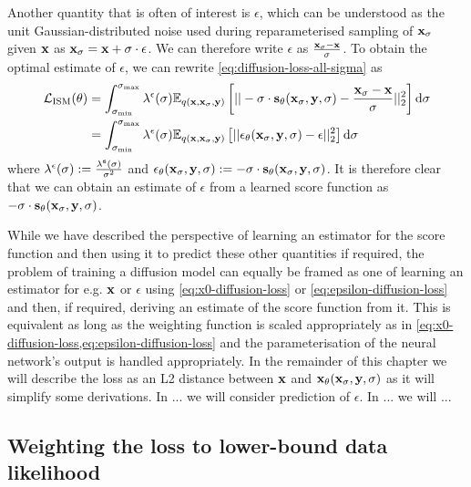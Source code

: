 Another quantity that is often of interest is $\epsilon$, which can be understood as the unit Gaussian-distributed noise used during reparameterised sampling of ${\mathbf{x}}_\sigma$ given ${\mathbf{x}}$ as ${\mathbf{x}}_\sigma = {\mathbf{x}} + \sigma \cdot \epsilon$. We can therefore write $\epsilon$ as $\frac{{\mathbf{x}}_\sigma-{\mathbf{x}}}{\sigma}$. To obtain the optimal estimate of $\epsilon$, we can rewrite \cref{eq:diffusion-loss-all-sigma} as
\begin{align} \label{eq:epsilon-diffusion-loss}
    \mathcal{L}_\text{ISM}(\theta) &= \int_{\sigma_\text{min}}^{\sigma_\text{max}} \lambda^\epsilon(\sigma) \mathbb{E}_{q({\mathbf{x}}, {\mathbf{x}}_\sigma, {\mathbf{y}})} \left[ 
    || -\sigma \cdot {\mathbf{s}}_\theta({\mathbf{x}}_\sigma, {\mathbf{y}}, \sigma) - \frac{{\mathbf{x}}_\sigma-{\mathbf{x}}}{\sigma} ||_2^2 \right] \mathrm{d}\sigma \\
    &= \int_{\sigma_\text{min}}^{\sigma_\text{max}} \lambda^\epsilon(\sigma) \mathbb{E}_{q({\mathbf{x}}, {\mathbf{x}}_\sigma, {\mathbf{y}})} \left[ 
    || \mathbf{\epsilon}_\theta({\mathbf{x}}_\sigma, {\mathbf{y}}, \sigma) - \epsilon ||_2^2 \right] \mathrm{d}\sigma
\end{align}
where $\lambda^\epsilon(\sigma) := \frac{\lambda^{\mathbf{s}}(\sigma)}{\sigma^2}$ and $\mathbf{\epsilon}_\theta({\mathbf{x}}_\sigma, {\mathbf{y}}, \sigma) := -\sigma \cdot {\mathbf{s}}_\theta({\mathbf{x}}_\sigma, {\mathbf{y}}, \sigma)$. It is therefore clear that we can obtain an estimate of $\epsilon$ from a learned score function as $-\sigma \cdot {\mathbf{s}}_\theta({\mathbf{x}}_\sigma, {\mathbf{y}}, \sigma)$.

While we have described the perspective of learning an estimator for the score function and then using it to predict these other quantities if required, the problem of training a diffusion model can equally be framed as one of learning an estimator for e.g. ${\mathbf{x}}$ or $\epsilon$ using \cref{eq:x0-diffusion-loss} or \cref{eq:epsilon-diffusion-loss} and then, if required, deriving an estimate of the score function from it. This is equivalent as long as the weighting function is scaled appropriately as in \cref{eq:x0-diffusion-loss,eq:epsilon-diffusion-loss} and the parameterisation of the neural network's output is handled appropriately. In the remainder of this chapter we will describe the loss as an L2 distance between ${\mathbf{x}}$ and ${\mathbf{x}}_\theta({\mathbf{x}}_\sigma, {\mathbf{y}}, \sigma)$ as it will simplify some derivations. In ... we will consider prediction of $\epsilon$. In ... we will ...

\subsection{Weighting the loss to lower-bound data likelihood} \label{sec:diffusion-likelihood}

